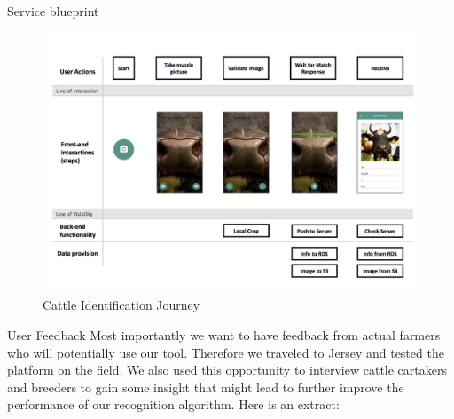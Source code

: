 \begin{subsection}{Service blueprint}
\begin{figure}
  \end{figure}
  \begin{figure}
    \includegraphics[width=\textwidth]{images/identify-cattle-journey.png}
    \caption{Cattle Identification Journey}
    \label{fig:identify-cattle-journey}
  \end{figure}
\end{subsection}


\begin{subsection}{User Feedback}
  Most importantly we want to have feedback from actual farmers who will potentially use our tool. Therefore we traveled to Jersey and tested the platform on the field. We also used this opportunity to interview cattle cartakers and breeders to gain some insight that might lead to further improve the performance of our recognition algorithm. Here is an extract:
\end{subsection}
